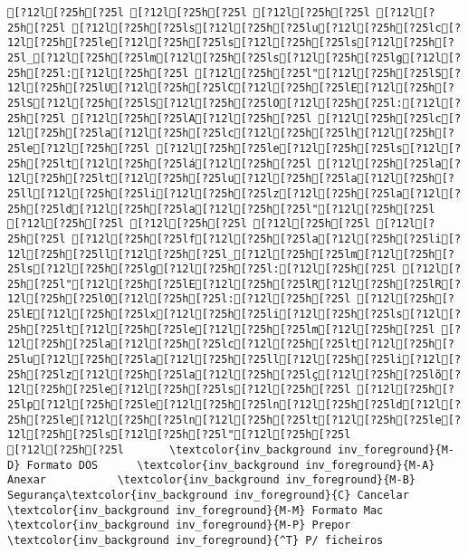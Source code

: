 \documentclass{scrartcl}
\begin{document}
\begin{Verbatim}
[?12l[?25h[?25l [?12l[?25h[?25l [?12l[?25h[?25l [?12l[?25h[?25l [?12l[?25h[?25ls[?12l[?25h[?25lu[?12l[?25h[?25lc[?12l[?25h[?25le[?12l[?25h[?25ls[?12l[?25h[?25ls[?12l[?25h[?25l_[?12l[?25h[?25lm[?12l[?25h[?25ls[?12l[?25h[?25lg[?12l[?25h[?25l:[?12l[?25h[?25l [?12l[?25h[?25l"[?12l[?25h[?25lS[?12l[?25h[?25lU[?12l[?25h[?25lC[?12l[?25h[?25lE[?12l[?25h[?25lS[?12l[?25h[?25lS[?12l[?25h[?25lO[?12l[?25h[?25l:[?12l[?25h[?25l [?12l[?25h[?25lA[?12l[?25h[?25l [?12l[?25h[?25lc[?12l[?25h[?25la[?12l[?25h[?25lc[?12l[?25h[?25lh[?12l[?25h[?25le[?12l[?25h[?25l [?12l[?25h[?25le[?12l[?25h[?25ls[?12l[?25h[?25lt[?12l[?25h[?25lá[?12l[?25h[?25l [?12l[?25h[?25la[?12l[?25h[?25lt[?12l[?25h[?25lu[?12l[?25h[?25la[?12l[?25h[?25ll[?12l[?25h[?25li[?12l[?25h[?25lz[?12l[?25h[?25la[?12l[?25h[?25ld[?12l[?25h[?25la[?12l[?25h[?25l"[?12l[?25h[?25l
[?12l[?25h[?25l [?12l[?25h[?25l [?12l[?25h[?25l [?12l[?25h[?25l [?12l[?25h[?25lf[?12l[?25h[?25la[?12l[?25h[?25li[?12l[?25h[?25ll[?12l[?25h[?25l_[?12l[?25h[?25lm[?12l[?25h[?25ls[?12l[?25h[?25lg[?12l[?25h[?25l:[?12l[?25h[?25l [?12l[?25h[?25l"[?12l[?25h[?25lE[?12l[?25h[?25lR[?12l[?25h[?25lR[?12l[?25h[?25lO[?12l[?25h[?25l:[?12l[?25h[?25l [?12l[?25h[?25lE[?12l[?25h[?25lx[?12l[?25h[?25li[?12l[?25h[?25ls[?12l[?25h[?25lt[?12l[?25h[?25le[?12l[?25h[?25lm[?12l[?25h[?25l [?12l[?25h[?25la[?12l[?25h[?25lc[?12l[?25h[?25lt[?12l[?25h[?25lu[?12l[?25h[?25la[?12l[?25h[?25ll[?12l[?25h[?25li[?12l[?25h[?25lz[?12l[?25h[?25la[?12l[?25h[?25lç[?12l[?25h[?25lõ[?12l[?25h[?25le[?12l[?25h[?25ls[?12l[?25h[?25l [?12l[?25h[?25lp[?12l[?25h[?25le[?12l[?25h[?25ln[?12l[?25h[?25ld[?12l[?25h[?25le[?12l[?25h[?25ln[?12l[?25h[?25lt[?12l[?25h[?25le[?12l[?25h[?25ls[?12l[?25h[?25l"[?12l[?25h[?25l
[?12l[?25h[?25l       \textcolor{inv_background inv_foreground}{M-D} Formato DOS      \textcolor{inv_background inv_foreground}{M-A} Anexar           \textcolor{inv_background inv_foreground}{M-B} Segurança\textcolor{inv_background inv_foreground}{C} Cancelar          \textcolor{inv_background inv_foreground}{M-M} Formato Mac      \textcolor{inv_background inv_foreground}{M-P} Prepor           \textcolor{inv_background inv_foreground}{^T} P/ ficheiros

\end{Verbatim}
\end{document}
